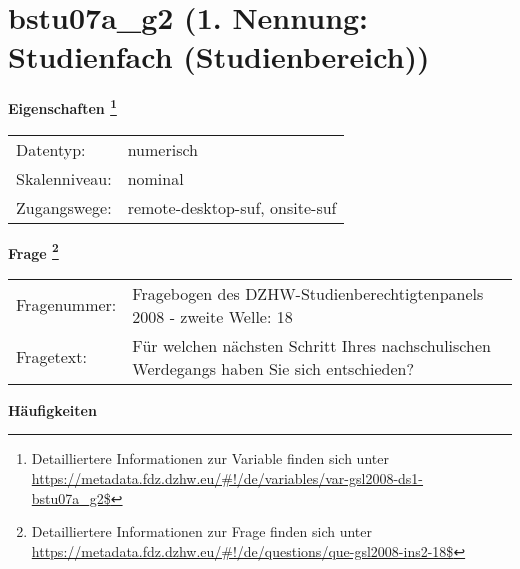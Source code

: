 
    \setcounter{footnote}{0}

    \vspace*{-1.8cm}
	\section{bstu07a\_g2 (1. Nennung: Studienfach (Studienbereich))}
	\label{section:bstu07a_g2}



    \vspace*{0.5cm}
    \noindent\textbf{Eigenschaften
	\footnote{Detailliertere Informationen zur Variable finden sich unter
		\url{https://metadata.fdz.dzhw.eu/\#!/de/variables/var-gsl2008-ds1-bstu07a_g2$}}}\\
	\begin{tabularx}{\hsize}{@{}lX}
	Datentyp: & numerisch \\
	Skalenniveau: & nominal \\
	Zugangswege: &
	  remote-desktop-suf, 
	  onsite-suf
 \\
    \end{tabularx}



				\vspace*{0.5cm}
                \noindent\textbf{Frage
	                \footnote{Detailliertere Informationen zur Frage finden sich unter
		              \url{https://metadata.fdz.dzhw.eu/\#!/de/questions/que-gsl2008-ins2-18$}}}\\
				\begin{tabularx}{\hsize}{@{}lX}
					Fragenummer: &
					  Fragebogen des DZHW-Studienberechtigtenpanels 2008 - zweite Welle:
					  18
 \\
					Fragetext: & Für welchen nächsten Schritt Ihres nachschulischen Werdegangs haben Sie sich entschieden? \\
				\end{tabularx}





        		\vspace*{0.5cm}
                \noindent\textbf{Häufigkeiten}

